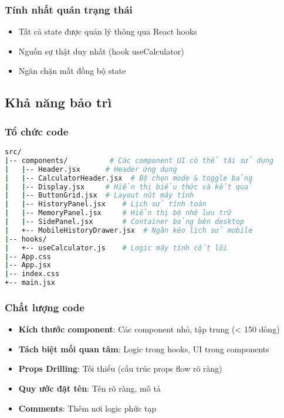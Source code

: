 \subsubsection{Tính nhất quán trạng thái}
\begin{itemize}
    \item Tất cả state được quản lý thông qua React hooks
    \item Nguồn sự thật duy nhất (hook useCalculator)
    \item Ngăn chặn mất đồng bộ state
\end{itemize}

\subsection{Khả năng bảo trì}

\subsubsection{Tổ chức code}

\begin{lstlisting}[language=bash, caption=Cấu trúc thư mục dự án]
src/
|-- components/          # Các component UI có thể tái sử dụng
|   |-- Header.jsx      # Header ứng dụng
|   |-- CalculatorHeader.jsx  # Bộ chọn mode & toggle bảng
|   |-- Display.jsx     # Hiển thị biểu thức và kết quả
|   |-- ButtonGrid.jsx  # Layout nút máy tính
|   |-- HistoryPanel.jsx    # Lịch sử tính toán
|   |-- MemoryPanel.jsx     # Hiển thị bộ nhớ lưu trữ
|   |-- SidePanel.jsx       # Container bảng bên desktop
|   +-- MobileHistoryDrawer.jsx  # Ngăn kéo lịch sử mobile
|-- hooks/
|   +-- useCalculator.js    # Logic máy tính cốt lõi
|-- App.css
|-- App.jsx
|-- index.css
+-- main.jsx
\end{lstlisting}

\subsubsection{Chất lượng code}
\begin{itemize}
    \item \textbf{Kích thước component}: Các component nhỏ, tập trung (< 150 dòng)
    \item \textbf{Tách biệt mối quan tâm}: Logic trong hooks, UI trong components
    \item \textbf{Props Drilling}: Tối thiểu (cấu trúc props flow rõ ràng)
    \item \textbf{Quy ước đặt tên}: Tên rõ ràng, mô tả
    \item \textbf{Comments}: Thêm nơi logic phức tạp
\end{itemize}

